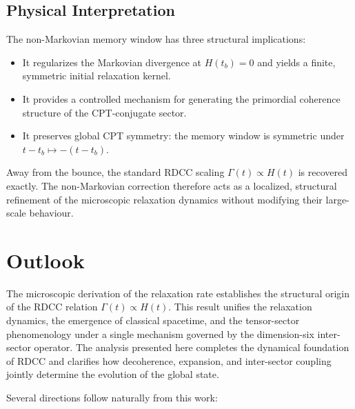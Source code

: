\documentclass[11pt,a4paper]{article}
\begin{document}
\subsection{Physical Interpretation}

The non-Markovian memory window has three structural implications:

\begin{itemize}
    \item It regularizes the Markovian divergence at \(H(t_b)=0\) and yields a
          finite, symmetric initial relaxation kernel.
    \item It provides a controlled mechanism for generating the primordial
          coherence structure of the CPT-conjugate sector.
    \item It preserves global CPT symmetry: the memory window is symmetric under
          \(t - t_b \mapsto -(t - t_b)\).
\end{itemize}

Away from the bounce, the standard RDCC scaling \(\Gamma(t) \propto H(t)\) is
recovered exactly. The non-Markovian correction therefore acts as a localized,
structural refinement of the microscopic relaxation dynamics without modifying
their large-scale behaviour.

\section{Outlook}

The microscopic derivation of the relaxation rate establishes the structural
origin of the RDCC relation \(\Gamma(t) \propto H(t)\). This result unifies the
relaxation dynamics, the emergence of classical spacetime, and the tensor-sector
phenomenology under a single mechanism governed by the dimension-six
inter-sector operator. The analysis presented here completes the dynamical
foundation of RDCC and clarifies how decoherence, expansion, and inter-sector
coupling jointly determine the evolution of the global state.

Several directions follow naturally from this work:
\end{document}
